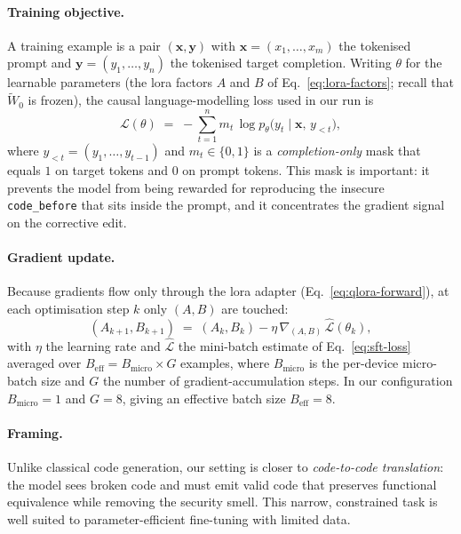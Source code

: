 \documentclass[12pt, a4paper]{report}
\begin{document}
\paragraph{Training objective.} A training example is a pair
\((\bm{x}, \bm{y})\) with \(\bm{x} = (x_{1},\dots,x_{m})\) the tokenised
prompt and \(\bm{y} = (y_{1},\dots,y_{n})\) the tokenised target
completion. Writing \(\theta\) for the learnable parameters
(the \gls{lora} factors \(A\) and \(B\) of Eq.~\eqref{eq:lora-factors};
recall that \(\widetilde{W}_0\) is frozen), the causal
language-modelling loss used in our run is
\begin{equation}
  \mathcal{L}(\theta)
    \;=\; -\sum_{t=1}^{n}
      m_{t}\,\log p_\theta\!\bigl(y_{t} \mid \bm{x},\, y_{<t}\bigr),
  \label{eq:sft-loss}
\end{equation}
where \(y_{<t} = (y_{1},\dots,y_{t-1})\) and \(m_{t} \in \{0,1\}\) is a
\emph{completion-only} mask that equals \(1\) on target tokens and \(0\)
on prompt tokens. This mask is important: it prevents the model from
being rewarded for reproducing the insecure \texttt{code\_before} that
sits inside the prompt, and it concentrates the gradient signal on the
corrective edit.

\paragraph{Gradient update.} Because gradients flow only through the
\gls{lora} adapter (Eq.~\eqref{eq:qlora-forward}), at each optimisation
step \(k\) only \((A, B)\) are touched:
\begin{equation}
  (A_{k+1}, B_{k+1})
    \;=\; (A_{k}, B_{k})
        - \eta\,\nabla_{(A,B)}\,
          \widehat{\mathcal{L}}(\theta_{k}),
  \label{eq:sft-step}
\end{equation}
with \(\eta\) the learning rate and
\(\widehat{\mathcal{L}}\) the mini-batch estimate of
Eq.~\eqref{eq:sft-loss} averaged over
\(B_{\mathrm{eff}} = B_{\mathrm{micro}} \times G\) examples, where
\(B_{\mathrm{micro}}\) is the per-device micro-batch size and
\(G\) the number of gradient-accumulation steps. In our configuration
\(B_{\mathrm{micro}} = 1\) and \(G = 8\), giving an effective batch
size \(B_{\mathrm{eff}} = 8\).

\paragraph{Framing.} Unlike classical code generation, our setting is
closer to \emph{code-to-code translation}: the model sees broken code
and must emit valid code that preserves functional equivalence while
removing the security smell. This narrow, constrained task is well
suited to parameter-efficient fine-tuning with limited data.
\end{document}
